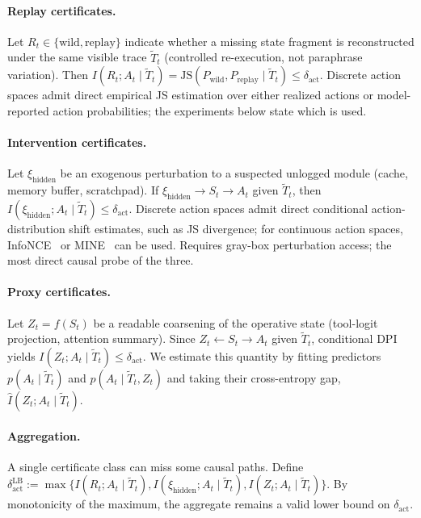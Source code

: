 \documentclass{article}
\begin{document}
  \paragraph{Replay certificates.}
  \label{sec:replay-cert}
  Let $R_t \in \{\text{wild}, \text{replay}\}$ indicate whether a missing state
  fragment is reconstructed under the same visible trace $\tilde T_t$
  (controlled re-execution, not paraphrase variation). Then $I(R_t; A_t \mid
  \tilde T_t) = \mathrm{JS}(P_\text{wild}, P_\text{replay} \mid \tilde T_t) \leq
   \delta_\text{act}$.  Discrete action spaces admit direct empirical JS
  estimation over either realized actions or model-reported action
  probabilities; the experiments below state which is used.

  \paragraph{Intervention certificates.}
  Let $\xi_\text{hidden}$ be an exogenous perturbation to a suspected unlogged
  module (cache, memory buffer, scratchpad). If $\xi_\text{hidden} \to S_t \to
  A_t$ given $\tilde T_t$, then $I(\xi_\text{hidden}; A_t \mid \tilde T_t) \leq
  \delta_\text{act}$. Discrete action spaces admit direct conditional
  action-distribution shift estimates, such as JS divergence; for continuous
  action spaces, InfoNCE~\citep{oord2018cpc} or MINE~\citep{belghazi2018mine}
  can be used. Requires gray-box perturbation access; the most direct causal
  probe of the three.

  \paragraph{Proxy certificates.}
  Let $Z_t = f(S_t)$ be a readable coarsening of the operative state (tool-logit
   projection, attention summary).  Since $Z_t \leftarrow S_t \to A_t$ given
  $\tilde T_t$, conditional DPI yields $I(Z_t; A_t \mid \tilde T_t) \leq
  \delta_\text{act}$.  We estimate this quantity by fitting predictors $p(A_t
  \mid \tilde T_t)$ and $p(A_t \mid \tilde T_t, Z_t)$ and taking their
  cross-entropy gap, $\hat I(Z_t; A_t \mid \tilde T_t)$.

  \paragraph{Aggregation.}
  A single certificate class can miss some causal paths. Define
  $\delta_\text{act}^\text{LB} := \max\{ I(R_t; A_t \mid \tilde T_t),
  I(\xi_\text{hidden}; A_t \mid \tilde T_t), I(Z_t; A_t \mid \tilde T_t) \}$. By
   monotonicity of the maximum, the aggregate remains a valid lower bound on
  $\delta_\text{act}$.
\end{document}
